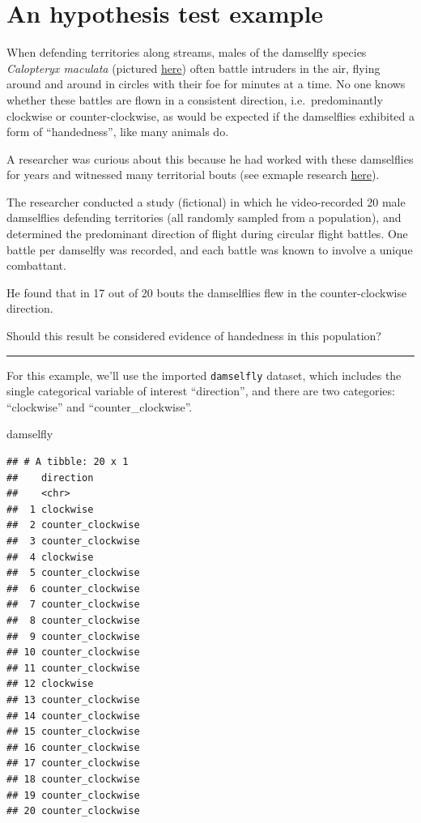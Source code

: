 \documentclass[
]{book}
\newenvironment{Shaded}{\begin{snugshade}}{\end{snugshade}}
\newcommand{\NormalTok}[1]{#1}
\begin{document}
\section{An hypothesis test example}\label{hyp_example}

When defending territories along streams, males of the damselfly species \emph{Calopteryx maculata} (pictured \href{https://en.wikipedia.org/wiki/Ebony_jewelwing\#/media/File:Ebony_Jewelwing,_male,_Gatineau_Park.jpg}{here}) often battle intruders in the air, flying around and around in circles with their foe for minutes at a time. No one knows whether these battles are flown in a consistent direction, i.e.~predominantly clockwise or counter-clockwise, as would be expected if the damselflies exhibited a form of ``handedness'', like many animals do.

A researcher was curious about this because he had worked with these damselflies for years and witnessed many territorial bouts (see exmaple research \href{http://www.nrcresearchpress.com/doi/abs/10.1139/z00-130\#.WdFv0GKPKJU}{here}).

The researcher conducted a study (fictional) in which he video-recorded 20 male damselflies defending territories (all randomly sampled from a population), and determined the predominant direction of flight during circular flight battles. One battle per damselfly was recorded, and each battle was known to involve a unique combattant.

He found that in 17 out of 20 bouts the damselflies flew in the counter-clockwise direction.

Should this result be considered evidence of handedness in this population?

\begin{center}\rule{0.5\linewidth}{0.5pt}\end{center}

For this example, we'll use the imported \texttt{damselfly} dataset, which includes the single categorical variable of interest ``direction'', and there are two categories: ``clockwise'' and ``counter\_clockwise''.

\begin{Shaded}
\begin{Highlighting}[]
\NormalTok{damselfly}
\end{Highlighting}
\end{Shaded}

\begin{verbatim}
## # A tibble: 20 x 1
##    direction        
##    <chr>            
##  1 clockwise        
##  2 counter_clockwise
##  3 counter_clockwise
##  4 clockwise        
##  5 counter_clockwise
##  6 counter_clockwise
##  7 counter_clockwise
##  8 counter_clockwise
##  9 counter_clockwise
## 10 counter_clockwise
## 11 counter_clockwise
## 12 clockwise        
## 13 counter_clockwise
## 14 counter_clockwise
## 15 counter_clockwise
## 16 counter_clockwise
## 17 counter_clockwise
## 18 counter_clockwise
## 19 counter_clockwise
## 20 counter_clockwise
\end{verbatim}
\end{document}
